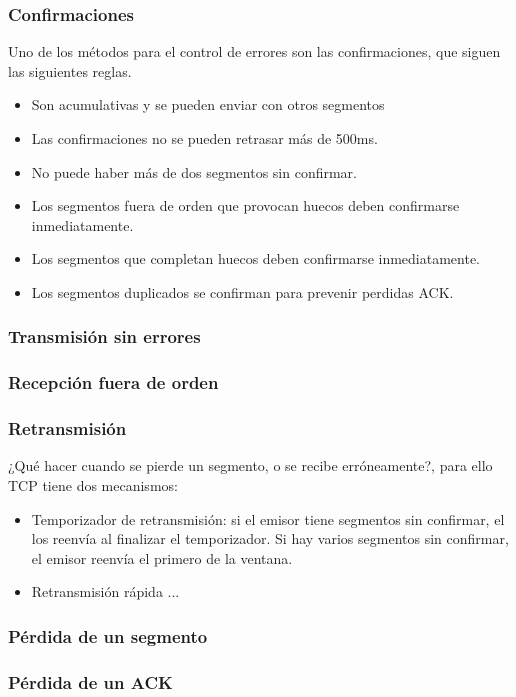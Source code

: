 \subsubsection{Confirmaciones}
Uno de los métodos para el control de errores son las confirmaciones, que siguen las siguientes reglas.
\begin{itemize}
    \item Son acumulativas y se pueden enviar con otros segmentos 
    \item Las confirmaciones no se pueden retrasar más de 500ms.
    \item No puede haber más de dos segmentos sin confirmar.
    \item Los segmentos fuera de orden que provocan huecos deben confirmarse inmediatamente.
    \item Los segmentos que completan huecos deben confirmarse inmediatamente.
    \item Los segmentos duplicados se confirman para prevenir perdidas ACK.
    
\end{itemize}
\subsubsection{Transmisión sin errores}
\subsubsection{Recepción fuera de orden}
\subsubsection{Retransmisión}
¿Qué hacer cuando se pierde un segmento, o se recibe erróneamente?, para ello TCP tiene dos mecanismos:
\begin{itemize}
    \item Temporizador de retransmisión: si el emisor tiene segmentos sin confirmar, el los reenvía al finalizar el temporizador. Si hay varios segmentos sin confirmar, el emisor reenvía el primero de la ventana.
    \item Retransmisión rápida ... 
\end{itemize}
\subsubsection{Pérdida de un segmento}
\subsubsection{Pérdida de un ACK}
